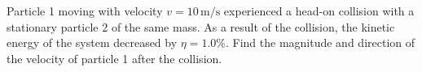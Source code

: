 \item Particle 1 moving with velocity \( v = 10 \, \text{m/s} \) experienced a head-on collision with a stationary particle 2 of the same mass. As a result of the collision, the kinetic energy of the system decreased by \( \eta = 1.0\% \). Find the magnitude and direction of the velocity of particle 1 after the collision.

